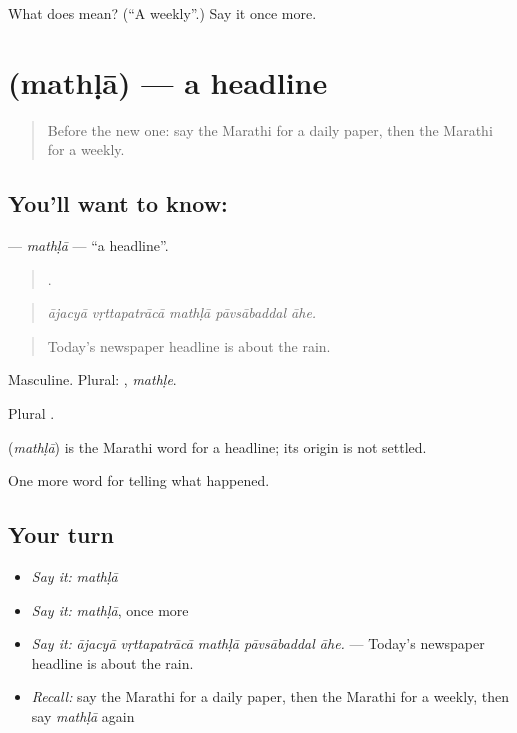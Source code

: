 \begin{tcolorbox}[breakable,colback=teal!4,colframe=teal!35!black,title={Before you move on}]
What does  mean? (\textquotedblleft{}A weekly\textquotedblright{}.) Say it once more.
\end{tcolorbox}
\section[\texorpdfstring{\mr{मथळा} (mathḷā)}{मथळा (mathḷā)}]{ (mathḷā) — a headline}

\label{lesson:MR-C310-mathla}



\begin{quote}
Before the new one: say the Marathi for a daily paper, then the Marathi for a weekly.
\end{quote}

\subsection*{You'll want to know: }
\textbf{} — \emph{mathḷā} — \textquotedblleft{}a headline\textquotedblright{}.

\begin{quote}
    .
\end{quote}

\begin{quote}
\emph{ājacyā vṛttapatrācā mathḷā pāvsābaddal āhe.}
\end{quote}

\begin{quote}
Today's newspaper headline is about the rain.
\end{quote}

Masculine. Plural: , \emph{mathḷe}.

Plural .

\begin{cousinweb}
\textbf{} (\emph{mathḷā}) is the Marathi word for a headline; its origin is not settled.
\end{cousinweb}

\begin{grammarlens}[title={What you've built}]
One more word for telling what happened.
\end{grammarlens}

\subsection*{Your turn}
\begin{itemize}
\raggedright
  \item \emph{Say it:} \emph{mathḷā}
  \item \emph{Say it:} \emph{mathḷā}, once more
  \item \emph{Say it:} \emph{ājacyā vṛttapatrācā mathḷā pāvsābaddal āhe.} — Today's newspaper headline is about the rain.
  \item \emph{Recall:} say the Marathi for a daily paper, then the Marathi for a weekly, then say \emph{mathḷā} again
\end{itemize}


